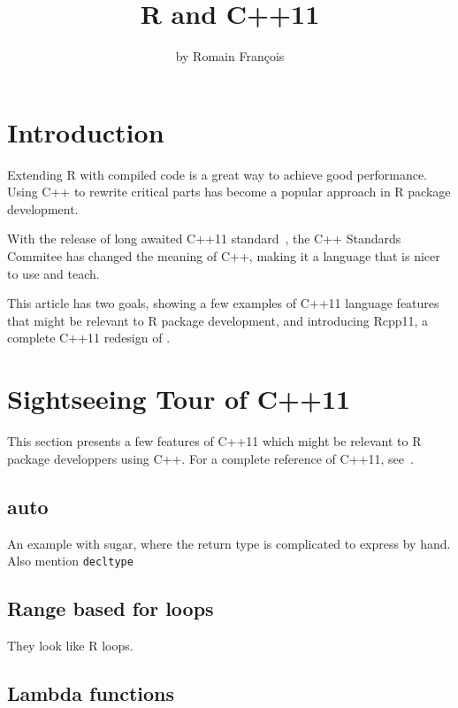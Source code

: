 \title{R and C++11}
\author{by Romain François}

\maketitle

\abstract{}

\section{Introduction}

Extending R with compiled code is a great way to achieve good performance. 
Using C++ to rewrite critical parts has become a popular approach
in R package development. 

With the release of long awaited C++11 standard~\citep{Cpp11}, 
the C++ Standards Commitee has changed the meaning of C++, making it 
a language that is nicer to use and teach. 

This article has two goals, 
showing a few examples of C++11 language features that might be 
relevant to R package development, and introducing
Rcpp11, a complete C++11 redesign of . 

\section{Sightseeing Tour of C++11}

This section presents a few features of C++11 which might be 
relevant to R package developpers using C++. For a complete 
reference of C++11, see~\citep{Stroustrup2013}. 

\subsection{auto}

An example with sugar, where the return type is complicated to express
by hand. Also mention \texttt{decltype}

\subsection{Range based for loops}

They look like R loops. 

\subsection{Lambda functions}


